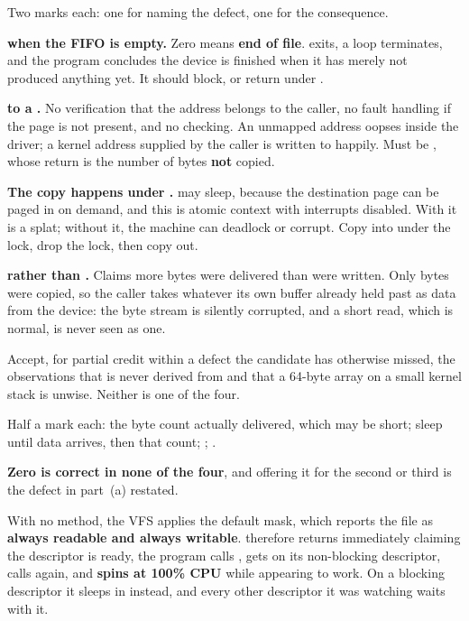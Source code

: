 
Two marks each: one for naming the defect, one for the consequence.

\textbf{ when the FIFO is empty.} Zero means \textbf{end of file}.  exits,
a  loop terminates, and the program concludes the device is finished
when it has merely not produced anything yet. It should block, or return  under
.

\textbf{ to a .} No verification that the address belongs to the
caller, no fault handling if the page is not present, and no  checking. An unmapped
address oopses inside the driver; a kernel address supplied by the caller is written to happily.
Must be , whose return is the number of bytes \textbf{not} copied.

\textbf{The copy happens under .}  may sleep, because the
destination page can be paged in on demand, and this is atomic context with interrupts disabled.
With  it is a  splat; without it, the machine can
deadlock or corrupt. Copy into  under the lock, drop the lock, then copy out.

\textbf{ rather than .} Claims more bytes were delivered than were
written. Only  bytes were copied, so the caller takes whatever its own buffer already held
past  as data from the device: the byte stream is silently corrupted, and a short read,
which is normal, is never seen as one.

Accept, for partial credit within a defect the candidate has otherwise missed, the observations that
 is never derived from  and that a 64-byte array on a small
kernel stack is unwise. Neither is one of the four.

Half a mark each: the byte count actually delivered, which may be short; sleep until data arrives,
then that count; ; .

\textbf{Zero is correct in none of the four}, and offering it for the second or third is the defect
in part~(a) restated.

With no  method, the VFS applies the default mask, which reports the file as
\textbf{always readable and always writable}.  therefore returns immediately claiming
the descriptor is ready, the program calls , gets  on its non-blocking
descriptor, calls  again, and \textbf{spins at 100\% CPU} while appearing to work. On a
blocking descriptor it sleeps in  instead, and every other descriptor it was watching
waits with it.

